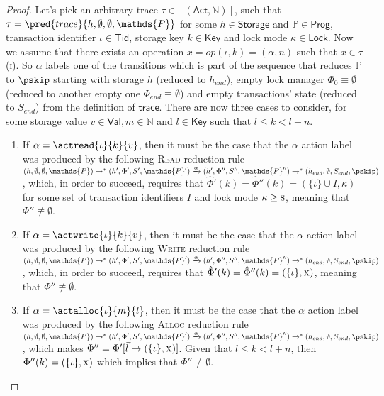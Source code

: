 \begin{proof}
Let's pick an arbitrary trace $\tau \in \mathsf{[(Act, \mathds{N})]}$, such that $\tau = \pred{trace}{h, \emptyset, \emptyset, \mathds{P}}$ for some $h \in \mathsf{Storage}$ and $\mathds{P} \in \mathsf{Prog}$, transaction identifier $\iota \in \mathsf{Tid}$, storage key $k \in \mathsf{Key}$ and lock mode $\kappa \in \mathsf{Lock}$. Now we assume that there exists an operation $x = op(\iota, k) = (\alpha, n)$ such that $x \in \tau$ (\textsc{i}). So $\alpha$ labels one of the transitions which is part of the sequence that reduces $\mathds{P}$ to $\pskip$ starting with storage $h$ (reduced to $h_{end}$), empty lock manager $\Phi_0 \equiv \emptyset$ (reduced to another empty one $\Phi_{end} \equiv \emptyset$) and empty transactions' state (reduced to $S_{end}$) from the definition of $\mathsf{trace}$. There are now three cases to consider, for some storage value $v \in \mathsf{Val}, m \in \mathds{N}$ and $l \in \mathsf{Key}$ such that $l \leq k < l + n$.
\begin{enumerate}
	\item If $\alpha = \actread{\iota}{k}{v}$, then it must be the case that the $\alpha$ action label was produced by the following \textsc{Read} reduction rule $(h, \emptyset, \emptyset, \mathds{P}) \rightarrow^* (h', \Phi', S', \mathds{P}') \xrightarrow{\alpha} (h', \Phi'', S'', \mathds{P}'') \rightarrow^* (h_{end}, \emptyset, S_{end}, \pskip)$, which, in order to succeed, requires that $\hat{\Phi}'(k) = \hat{\Phi}''(k) = (\{ \iota \} \cup I, \kappa)$ for some set of transaction identifiers $I$ and lock mode $\kappa \geq \textsc{s}$, meaning that $\Phi'' \not\equiv \emptyset$.
	
	\item If $\alpha = \actwrite{\iota}{k}{v}$, then it must be the case that the $\alpha$ action label was produced by the following \textsc{Write} reduction rule $(h, \emptyset, \emptyset, \mathds{P}) \rightarrow^* (h', \Phi', S', \mathds{P}') \xrightarrow{\alpha} (h', \Phi'', S'', \mathds{P}'') \rightarrow^* (h_{end}, \emptyset, S_{end}, \pskip)$, which, in order to succeed, requires that $\hat{\Phi}'(k) = \hat{\Phi}''(k) = (\{ \iota \}, \textsc{x})$, meaning that $\Phi'' \not\equiv \emptyset$.
	
	\item If $\alpha = \actalloc{\iota}{m}{l}$, then it must be the case that the $\alpha$ action label was produced by the following \textsc{Alloc} reduction rule $(h, \emptyset, \emptyset, \mathds{P}) \rightarrow^* (h', \Phi', S', \mathds{P}') \xrightarrow{\alpha} (h', \Phi'', S'', \mathds{P}'') \rightarrow^* (h_{end}, \emptyset, S_{end}, \pskip)$, which makes $\Phi'' = \Phi'[\vec{l} \mapsto (\{\iota\}, \textsc{x})]$. Given that $l \leq k < l + n$, then $\Phi''(k) = (\{\iota\}, \textsc{x})$ which implies that $\Phi'' \not\equiv \emptyset$.
\end{enumerate}


\end{proof}
